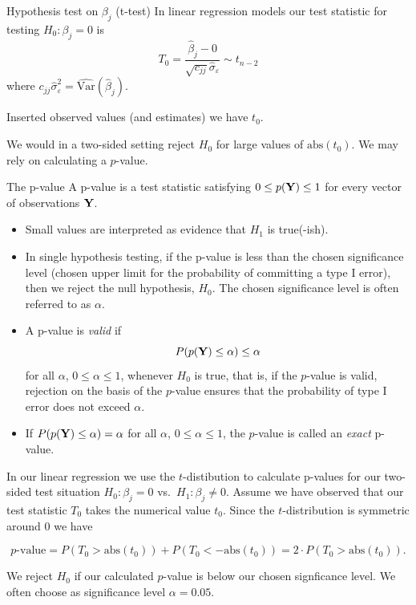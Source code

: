 \documentclass[
  ignorenonframetext,
]{beamer}
\begin{document}
\begin{frame}
\begin{block}{Hypothesis test on \(\beta_j\) (t-test)}
\label{hypothesis-test-on-beta_j-t-test}
In linear regression models our test statistic for testing
\(H_0: \beta_j=0\) is
\[T_0=\frac{\hat{\beta}_j-0}{\sqrt{c_{jj}}\hat{\sigma}_{\varepsilon}}\sim t_{n-2}\]
where
\(c_{jj}\hat{\sigma}_{\varepsilon}^2=\widehat{\text{Var}}(\hat{\beta}_j)\).

Inserted observed values (and estimates) we have \(t_0\).

We would in a two-sided setting reject \(H_0\) for large values of
\(\text{abs}(t_0)\). We may rely on calculating a \(p\)-value.
\end{block}
\end{frame}

\begin{frame}
\begin{block}{The p-value}
\label{the-p-value}
A p-value is a test statistic satisfying \(0 \leq p({\bf Y}) \leq 1\)
for every vector of observations \({\bf Y}\).

\begin{itemize}
\item
  Small values are interpreted as evidence that \(H_1\) is true(-ish).
\item
  In single hypothesis testing, if the p-value is less than the chosen
  significance level (chosen upper limit for the probability of
  committing a type I error), then we reject the null hypothesis,
  \(H_0\). The chosen significance level is often referred to as
  \(\alpha\).
\item
  A p-value is \emph{valid} if
  \[ P(p({\bf Y}) \leq \alpha) \leq \alpha\] for all \(\alpha\),
  \(0 \leq \alpha \leq 1\), whenever \(H_0\) is true, that is, if the
  \(p\)-value is valid, rejection on the basis of the \(p\)-value
  ensures that the probability of type I error does not exceed
  \(\alpha\).
\item
  If \(P(p({\bf Y}) \leq \alpha) = \alpha\) for all \(\alpha\),
  \(0 \leq \alpha \leq 1\), the \(p\)-value is called an \emph{exact}
  p-value.
\end{itemize}
\end{block}
\end{frame}

\begin{frame}
In our linear regression we use the \(t\)-distibution to calculate
p-values for our two-sided test situation \(H_0: \beta_j=0\)
vs.~\(H_1: \beta_j \neq 0\). Assume we have observed that our test
statistic \(T_0\) takes the numerical value \(t_0\). Since the
\(t\)-distribution is symmetric around \(0\) we have

\[p\text{-value}=P(T_0>\text{abs}(t_0))+P(T_0<-\text{abs}(t_0))=2\cdot P(T_0>\text{abs}(t_0)).\]

We reject \(H_0\) if our calculated \(p\)-value is below our chosen
signficance level. We often choose as significance level
\(\alpha=0.05\).
\end{frame}
\end{document}
